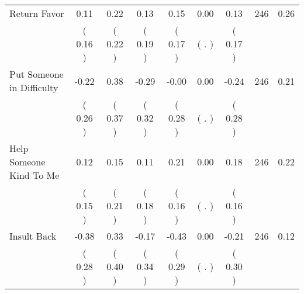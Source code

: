 \begin{tabular}{lcccccccc}
Return Favor &      0.11 &      0.22 &      0.13 &      0.15 &      0.00 &      0.13 & 246 &       0.26 \\ 
 & (     0.16 ) & (     0.22 ) & (     0.19 ) & (     0.17 ) & (        . ) & (     0.17 ) & \\
Put Someone in Difficulty &     -0.22 &      0.38 &     -0.29 &     -0.00 &      0.00 &     -0.24 & 246 &       0.21 \\ 
 & (     0.26 ) & (     0.37 ) & (     0.32 ) & (     0.28 ) & (        . ) & (     0.28 ) & \\
Help Someone Kind To Me &      0.12 &      0.15 &      0.11 &      0.21 &      0.00 &      0.18 & 246 &       0.22 \\ 
 & (     0.15 ) & (     0.21 ) & (     0.18 ) & (     0.16 ) & (        . ) & (     0.16 ) & \\
Insult Back &     -0.38 &      0.33 &     -0.17 &     -0.43 &      0.00 &     -0.21 & 246 &       0.12 \\ 
 & (     0.28 ) & (     0.40 ) & (     0.34 ) & (     0.29 ) & (        . ) & (     0.30 ) & \\
\bottomrule
\end{tabular}
